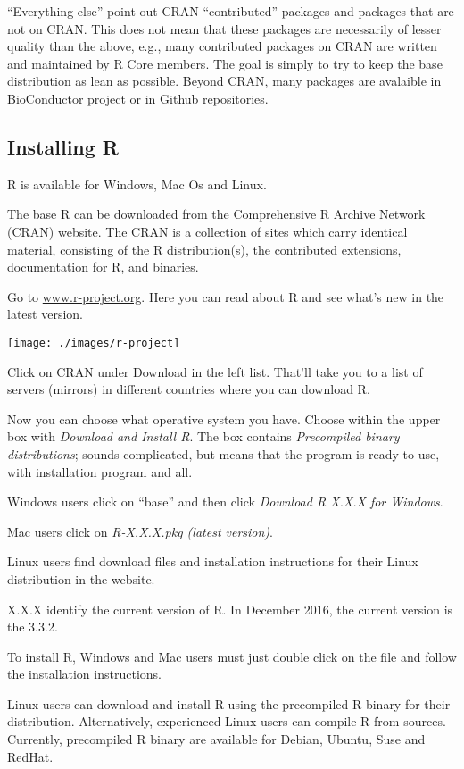 \documentclass[]{book}
\begin{document}
``Everything else'' point out CRAN ``contributed'' packages and packages
that are not on CRAN. This does not mean that these packages are
necessarily of lesser quality than the above, e.g., many contributed
packages on CRAN are written and maintained by R Core members. The goal
is simply to try to keep the base distribution as lean as possible.
Beyond CRAN, many packages are avalaible in BioConductor project or in
Github repositories.

\clearpage

\subsection{Installing R}\label{installing-r}

R is available for Windows, Mac Os and Linux.

The base R can be downloaded from the Comprehensive R Archive Network
(CRAN) website. The CRAN is a collection of sites which carry identical
material, consisting of the R distribution(s), the contributed
extensions, documentation for R, and binaries.

Go to \href{http://www.r-project.org/}{www.r-project.org}. Here you can
read about R and see what's new in the latest version.

\texttt{[image: ./images/r-project]}

Click on CRAN under Download in the left list. That'll take you to a
list of servers (mirrors) in different countries where you can download
R.

Now you can choose what operative system you have. Choose within the
upper box with \emph{Download and Install R}. The box contains
\emph{Precompiled binary distributions}; sounds complicated, but means
that the program is ready to use, with installation program and all.

Windows users click on ``base'' and then click \emph{Download R X.X.X
for Windows}.

Mac users click on \emph{R-X.X.X.pkg (latest version)}.

Linux users find download files and installation instructions for their
Linux distribution in the website.

X.X.X identify the current version of R. In December 2016, the current
version is the 3.3.2.

To install R, Windows and Mac users must just double click on the file
and follow the installation instructions.

Linux users can download and install R using the precompiled R binary
for their distribution. Alternatively, experienced Linux users can
compile R from sources. Currently, precompiled R binary are available
for Debian, Ubuntu, Suse and RedHat.
\end{document}
